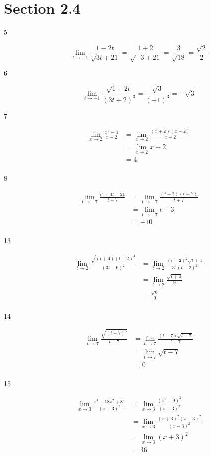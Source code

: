 \documentclass{exam}
\begin{document}
\section{Section 2.4}
\begin{description}
\item[5]
\[
  \lim_{t \to -1} \frac{1-2t}{\sqrt{3t + 21}} = \frac{1 + 2}{\sqrt{-3 + 21}} = \frac{3}{\sqrt{18}} = \frac{\sqrt{2}}{2}
\]

\item[6]
\[
  \lim_{t \to -1} \frac{\sqrt{1-2t}}{(3t + 2)^3} = \frac{\sqrt{3}}{(-1)^3} = - \sqrt{3}
\]

\item[7]
\begin{align*}
  \lim_{x \to 2} \frac{x^2 - 4}{x-2} &=   \lim_{x \to 2} \frac{(x+2)(x-2)}{x-2} \\
  &= \lim_{x \to 2} x+2 \\
  &= 4 \\
\end{align*}

\item[8]
\begin{align*}
  \lim_{t \to -7} \frac{t^2 + 4t - 21}{t+7} &= \lim_{t \to -7} \frac{(t-3)(t+7)}{t+7} \\
  &= \lim_{t \to -7} t-3 \\
  &= -10 \\
\end{align*}

\item[13]
\begin{align*}
  \lim_{t \to 2} \frac{\sqrt{(t+4)(t-2)^4}}{(3t-6)^2} &= \lim_{t \to 2} \frac{(t-2)^2\sqrt{t+4}}{3^2(t-2)^2} \\
  &= \lim_{t \to 2} \frac{\sqrt{t+4}}{9} \\
  &= \frac{\sqrt{6}}{9} \\
\end{align*}

\item[14]
\begin{align*}
  \lim_{t \to 7} \frac{\sqrt{(t-7)^3}}{t-7} &= \lim_{t \to 7} \frac{(t-7)\sqrt{t-7}}{t-7} \\
  &= \lim_{t \to 7} \sqrt{t-7} \\
  &= 0 \\
\end{align*}

\item[15]
\begin{align*}
   \lim_{x \to 3} \frac{x^4 - 18x^2 + 81}{(x-3)^2} &= \lim_{x \to 3} \frac{(x^2 - 9)^2}{(x-3)^2} \\
   &= \lim_{x \to 3} \frac{(x + 3)^2(x-3)^2}{(x-3)^2} \\
   &= \lim_{x \to 3} (x + 3)^2 \\
   &= 36 \\
\end{align*}


\end{description}
\end{document}
